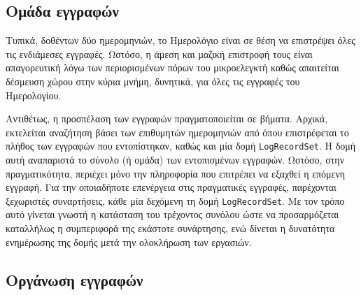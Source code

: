 %
%

\subsection{Ομάδα εγγραφών}
Τυπικά, δοθέντων δύο ημερομηνιών, το Ημερολόγιο είναι σε θέση να επιστρέψει όλες
τις ενδιάμεσες εγγραφές. Ωστόσο, η άμεση και μαζική επιστροφή τους είναι
απαγορευτική λόγω των περιορισμένων πόρων του μικροελεγκτή καθώς απαιτείται
δέσμευση χώρου στην κύρια μνήμη, δυνητικά, για όλες τις εγγραφές του
Ημερολογίου.
%

Αντιθέτως, η προσπέλαση των εγγραφών πραγματοποιείται σε βήματα. Αρχικά,
εκτελείται αναζήτηση βάσει των επιθυμητών ημερομηνιών από όπου επιστρέφεται το
πλήθος των εγγραφών που εντοπίστηκαν, καθώς και μία δομή \verb~LogRecordSet~. H
δομή αυτή αναπαριστά το σύνολο (ή ομάδα) των εντοπισμένων εγγραφών.
Ωστόσο, στην πραγματικότητα, περιέχει μόνο την πληροφορία που επιτρέπει να
εξαχθεί η επόμενη εγγραφή.
Για την οποιαδήποτε επενέργεια στις πραγματικές εγγραφές, παρέχονται ξεχωριστές
συναρτήσεις, κάθε μία δεχόμενη τη δομή \verb~LogRecordSet~. Με τον τρόπο αυτό
γίνεται γνωστή η κατάσταση του τρέχοντος συνόλου ώστε να προσαρμόζεται
καταλλήλως η συμπεριφορά της εκάστοτε συνάρτησης, ενώ δίνεται η δυνατότητα
ενημέρωσης της δομής μετά την ολοκλήρωση των εργασιών.



\subsection{Οργάνωση εγγραφών}


